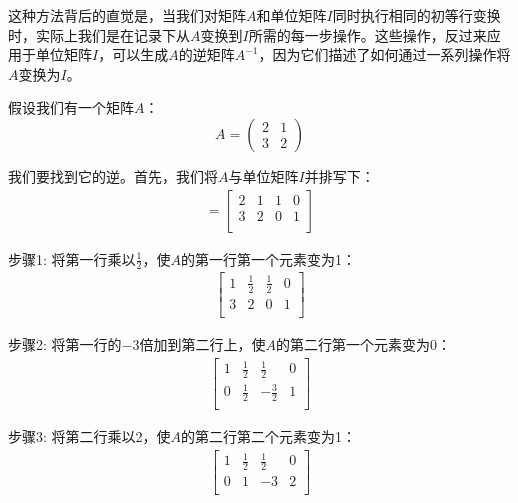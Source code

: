 这种方法背后的直觉是，当我们对矩阵\(A\)和单位矩阵\(I\)同时执行相同的初等行变换时，实际上我们是在记录下从\(A\)变换到\(I\)所需的每一步操作。这些操作，反过来应用于单位矩阵\(I\)，可以生成\(A\)的逆矩阵\(A^{-1}\)，因为它们描述了如何通过一系列操作将\(A\)变换为\(I\)。

\vspace{0.5cm}

\begin{exercise}
假设我们有一个矩阵\(A\)：
\[A = \begin{pmatrix} 2 & 1 \\ 3 & 2 \end{pmatrix}\]

我们要找到它的逆。首先，我们将\(A\)与单位矩阵\(I\)并排写下：
\begin{align*}
[A|I] = \left[\begin{array}{cc|cc}
2 & 1 & 1 & 0 \\
3 & 2 & 0 & 1 \\
\end{array}\right]
\end{align*}

步骤1: 将第一行乘以\(\frac{1}{2}\)，使\(A\)的第一行第一个元素变为1：
\begin{align*}
\left[\begin{array}{cc|cc}
1 & \frac{1}{2} & \frac{1}{2} & 0 \\
3 & 2 & 0 & 1 \\
\end{array}\right]
\end{align*}

步骤2: 将第一行的\(-3\)倍加到第二行上，使\(A\)的第二行第一个元素变为0：
\begin{align*}
\left[\begin{array}{cc|cc}
1 & \frac{1}{2} & \frac{1}{2} & 0 \\
0 & \frac{1}{2} & -\frac{3}{2} & 1 \\
\end{array}\right]
\end{align*}

步骤3: 将第二行乘以2，使\(A\)的第二行第二个元素变为1：
\begin{align*}
\left[\begin{array}{cc|cc}
1 & \frac{1}{2} & \frac{1}{2} & 0 \\
0 & 1 & -3 & 2 \\
\end{array}\right]
\end{align*}


\end{exercise}
